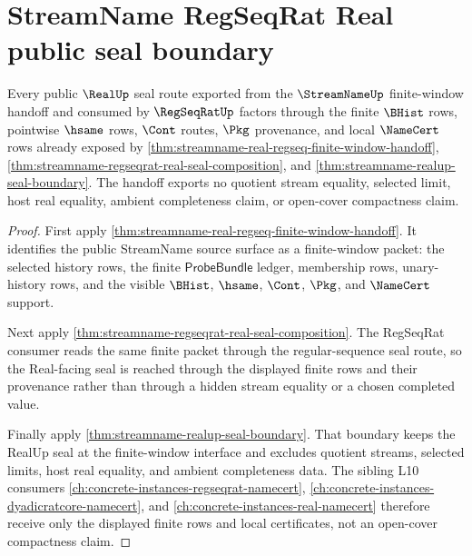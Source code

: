 \section{StreamName RegSeqRat Real public seal boundary}
\label{sec:streamname-regseqrat-real-public-seal-boundary}

\begin{theorem}
\label{thm:streamname-regseqrat-real-public-seal-no-quotient}
Every public $\RealUp$ seal route exported from the $\StreamNameUp$
finite-window handoff and consumed by $\RegSeqRatUp$ factors through the finite
$\BHist$ rows, pointwise $\hsame$ rows, $\Cont$ routes, $\Pkg$ provenance, and
local $\NameCert$ rows already exposed by
\autoref{thm:streamname-real-regseq-finite-window-handoff},
\autoref{thm:streamname-regseqrat-real-seal-composition}, and
\autoref{thm:streamname-realup-seal-boundary}. The handoff exports no quotient
stream equality, selected limit, host real equality, ambient completeness
claim, or open-cover compactness claim.
\end{theorem}
\begin{proof}
First apply \autoref{thm:streamname-real-regseq-finite-window-handoff}. It
identifies the public StreamName source surface as a finite-window packet: the
selected history rows, the finite $\mathsf{ProbeBundle}$ ledger, membership
rows, unary-history rows, and the visible $\BHist$, $\hsame$, $\Cont$, $\Pkg$,
and $\NameCert$ support.

Next apply \autoref{thm:streamname-regseqrat-real-seal-composition}. The
RegSeqRat consumer reads the same finite packet through the regular-sequence
seal route, so the Real-facing seal is reached through the displayed finite
rows and their provenance rather than through a hidden stream equality or a
chosen completed value.

Finally apply \autoref{thm:streamname-realup-seal-boundary}. That boundary
keeps the RealUp seal at the finite-window interface and excludes quotient
streams, selected limits, host real equality, and ambient completeness data.
The sibling L10 consumers
\autoref{ch:concrete-instances-regseqrat-namecert},
\autoref{ch:concrete-instances-dyadicratcore-namecert}, and
\autoref{ch:concrete-instances-real-namecert} therefore receive only the
displayed finite rows and local certificates, not an open-cover compactness
claim.
\end{proof}

